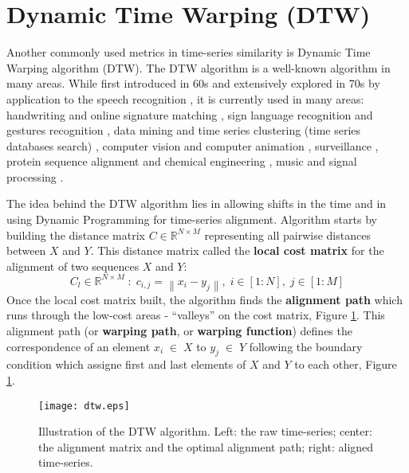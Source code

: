 \section{Dynamic Time Warping (DTW)}
Another commonly used metrics in time-series similarity is Dynamic Time Warping algorithm (DTW). The DTW algorithm is a well-known algorithm in many areas. While first introduced in 60s \cite{citeulike:3733907} and extensively explored in 70s by application to the speech recognition \cite{citeulike:603020}, \cite{citeulike:3496861} it is currently used in many areas: handwriting and online signature matching \cite{citeulike:2838910} \cite{citeulike:2584345}, sign language recognition \cite{citeulike:3789957} and gestures recognition \cite{citeulike:3789964} \cite{citeulike:3789957}, data mining and time series clustering (time series databases search) \cite{citeulike:3815076} \cite{citeulike:3733893} \cite{citeulike:3788783} \cite{citeulike:3731715} \cite{citeulike:3731713} \cite{citeulike:3789897}, computer vision and computer animation \cite{citeulike:3728229}, surveillance \cite{citeulike:964832}, protein sequence alignment and chemical engineering \cite{citeulike:3733894}, music and signal processing \cite{citeulike:3736775} \cite{citeulike:3728229} \cite{citeulike:3728228}.

The idea behind the DTW algorithm lies in allowing shifts in the time and in using Dynamic Programming \cite{citeulike:3733907} for time-series alignment. Algorithm starts by building the distance matrix $C \in \mathbb{R}^{N \times M}$ representing all pairwise distances between $X$ and $Y$. This distance matrix called the \textbf{local cost matrix} for the alignment of two sequences $X$ and $Y$:
\begin{equation}
\label{eq:localcost}
C_{l} \in \mathbb{R}^{N \times M} \; : \; c_{i,j} = \left\| x_{i} - y_{j} \right\|, \; i \in [1:N], \; j \in [1:M]
\end{equation}
Once the local cost matrix built, the algorithm finds the \textbf{alignment path} which runs through the low-cost areas - ``valleys'' on the cost matrix, Figure \ref{fig:dtw}. This alignment path (or \textbf{warping path}, or \textbf{warping function}) defines the correspondence of an element $x_{i} \; \in \; X$ to $y_{j} \; \in \; Y$ following the boundary condition which assigne first and last elements of $X$ and $Y$ to each other, Figure \ref{fig:dtw}.

\begin{figure}[tbp]
   \centering
   \texttt{[image: dtw.eps]}
   \caption{Illustration of the DTW algorithm. Left: the raw time-series; center: the alignment matrix and the optimal alignment path; right: aligned time-series.}
   \label{fig:dtw}
\end{figure} 

